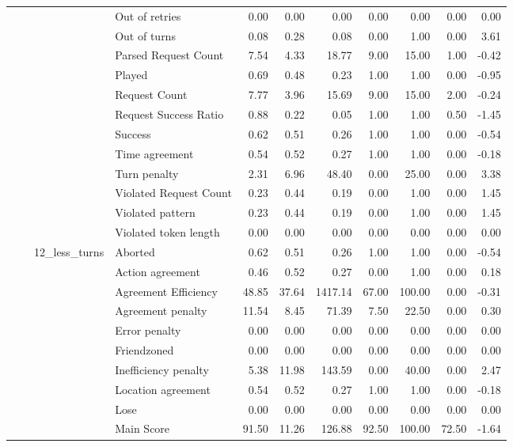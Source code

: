 \begin{tabular}{llllrrrrrrr}
 &  &  & Out of retries & 0.00 & 0.00 & 0.00 & 0.00 & 0.00 & 0.00 & 0.00 \\
 &  &  & Out of turns & 0.08 & 0.28 & 0.08 & 0.00 & 1.00 & 0.00 & 3.61 \\
 &  &  & Parsed Request Count & 7.54 & 4.33 & 18.77 & 9.00 & 15.00 & 1.00 & -0.42 \\
 &  &  & Played & 0.69 & 0.48 & 0.23 & 1.00 & 1.00 & 0.00 & -0.95 \\
 &  &  & Request Count & 7.77 & 3.96 & 15.69 & 9.00 & 15.00 & 2.00 & -0.24 \\
 &  &  & Request Success Ratio & 0.88 & 0.22 & 0.05 & 1.00 & 1.00 & 0.50 & -1.45 \\
 &  &  & Success & 0.62 & 0.51 & 0.26 & 1.00 & 1.00 & 0.00 & -0.54 \\
 &  &  & Time agreement & 0.54 & 0.52 & 0.27 & 1.00 & 1.00 & 0.00 & -0.18 \\
 &  &  & Turn penalty & 2.31 & 6.96 & 48.40 & 0.00 & 25.00 & 0.00 & 3.38 \\
 &  &  & Violated Request Count & 0.23 & 0.44 & 0.19 & 0.00 & 1.00 & 0.00 & 1.45 \\
 &  &  & Violated pattern & 0.23 & 0.44 & 0.19 & 0.00 & 1.00 & 0.00 & 1.45 \\
 &  &  & Violated token length & 0.00 & 0.00 & 0.00 & 0.00 & 0.00 & 0.00 & 0.00 \\
\cline{3-11}
 &  & \multirow[t]{27}{*}{12_less_turns} & Aborted & 0.62 & 0.51 & 0.26 & 1.00 & 1.00 & 0.00 & -0.54 \\
 &  &  & Action agreement & 0.46 & 0.52 & 0.27 & 0.00 & 1.00 & 0.00 & 0.18 \\
 &  &  & Agreement Efficiency & 48.85 & 37.64 & 1417.14 & 67.00 & 100.00 & 0.00 & -0.31 \\
 &  &  & Agreement penalty & 11.54 & 8.45 & 71.39 & 7.50 & 22.50 & 0.00 & 0.30 \\
 &  &  & Error penalty & 0.00 & 0.00 & 0.00 & 0.00 & 0.00 & 0.00 & 0.00 \\
 &  &  & Friendzoned & 0.00 & 0.00 & 0.00 & 0.00 & 0.00 & 0.00 & 0.00 \\
 &  &  & Inefficiency penalty & 5.38 & 11.98 & 143.59 & 0.00 & 40.00 & 0.00 & 2.47 \\
 &  &  & Location agreement & 0.54 & 0.52 & 0.27 & 1.00 & 1.00 & 0.00 & -0.18 \\
 &  &  & Lose & 0.00 & 0.00 & 0.00 & 0.00 & 0.00 & 0.00 & 0.00 \\
 &  &  & Main Score & 91.50 & 11.26 & 126.88 & 92.50 & 100.00 & 72.50 & -1.64 \\

\end{tabular}
